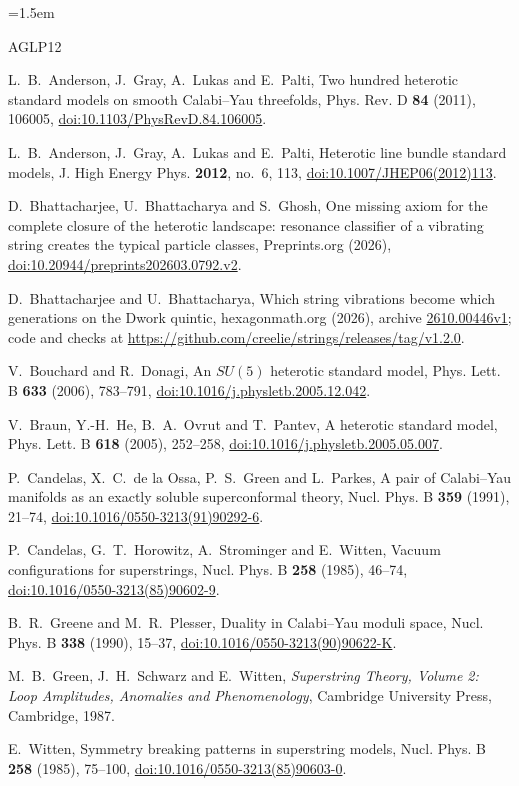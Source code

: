 \documentclass[11pt]{amsart}
\theoremstyle{definition}
\theoremstyle{remark}
\newcommand{\hexagonid}{\href{https://hexagonmath.org/2610.00446v1}{2610.00446v1}}
\begin{document}
\emergencystretch=1.5em
\begin{thebibliography}{AGLP12}\raggedright

L.~B.~Anderson, J.~Gray, A.~Lukas and E.~Palti, Two hundred heterotic
standard models on smooth Calabi--Yau threefolds, Phys. Rev. D \textbf{84}
(2011), 106005,
\href{https://doi.org/10.1103/PhysRevD.84.106005}{doi:10.1103/PhysRevD.84.106005}.

L.~B.~Anderson, J.~Gray, A.~Lukas and E.~Palti, Heterotic line bundle
standard models, J. High Energy Phys. \textbf{2012}, no.~6, 113,
\href{https://doi.org/10.1007/JHEP06(2012)113}{doi:10.1007/JHEP06(2012)113}.

D.~Bhattacharjee, U.~Bhattacharya and S.~Ghosh, One missing axiom for the
complete closure of the heterotic landscape: resonance classifier of a
vibrating string creates the typical particle classes, Preprints.org (2026),
\href{https://doi.org/10.20944/preprints202603.0792.v2}{doi:10.20944/preprints202603.0792.v2}.

D.~Bhattacharjee and U.~Bhattacharya, Which string vibrations become which
generations on the Dwork quintic, hexagonmath.org (2026), archive
\hexagonid; code and checks at
\url{https://github.com/creelie/strings/releases/tag/v1.2.0}.

V.~Bouchard and R.~Donagi, An $SU(5)$ heterotic standard model, Phys. Lett.
B \textbf{633} (2006), 783--791,
\href{https://doi.org/10.1016/j.physletb.2005.12.042}{doi:10.1016/j.physletb.2005.12.042}.

V.~Braun, Y.-H.~He, B.~A.~Ovrut and T.~Pantev, A heterotic standard model,
Phys. Lett. B \textbf{618} (2005), 252--258,
\href{https://doi.org/10.1016/j.physletb.2005.05.007}{doi:10.1016/j.physletb.2005.05.007}.

P.~Candelas, X.~C.~de la Ossa, P.~S.~Green and L.~Parkes, A pair of
Calabi--Yau manifolds as an exactly soluble superconformal theory, Nucl.
Phys. B \textbf{359} (1991), 21--74,
\href{https://doi.org/10.1016/0550-3213(91)90292-6}{doi:10.1016/0550-3213(91)90292-6}.

P.~Candelas, G.~T.~Horowitz, A.~Strominger and E.~Witten, Vacuum
configurations for superstrings, Nucl. Phys. B \textbf{258} (1985), 46--74,
\href{https://doi.org/10.1016/0550-3213(85)90602-9}{doi:10.1016/0550-3213(85)90602-9}.

B.~R.~Greene and M.~R.~Plesser, Duality in Calabi--Yau moduli space, Nucl.
Phys. B \textbf{338} (1990), 15--37,
\href{https://doi.org/10.1016/0550-3213(90)90622-K}{doi:10.1016/0550-3213(90)90622-K}.

M.~B.~Green, J.~H.~Schwarz and E.~Witten, \emph{Superstring Theory, Volume 2:
Loop Amplitudes, Anomalies and Phenomenology}, Cambridge University Press,
Cambridge, 1987.

E.~Witten, Symmetry breaking patterns in superstring models, Nucl. Phys. B
\textbf{258} (1985), 75--100,
\href{https://doi.org/10.1016/0550-3213(85)90603-0}{doi:10.1016/0550-3213(85)90603-0}.

\end{thebibliography}
\end{document}
